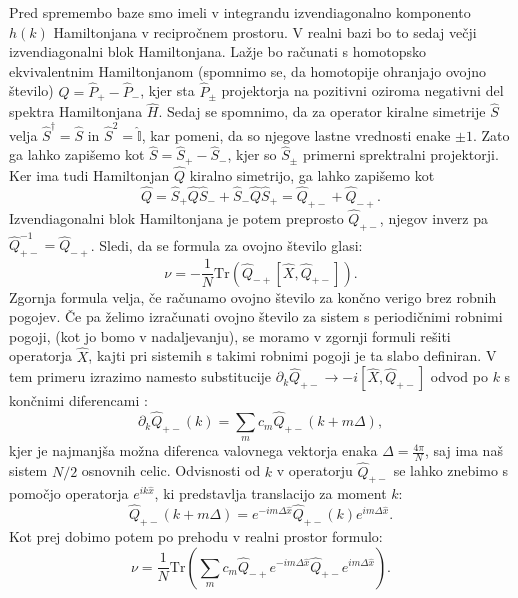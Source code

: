 Pred spremembo baze smo imeli v integrandu izvendiagonalno komponento $h(k)$ Hamiltonjana v recipročnem prostoru. V realni bazi bo to sedaj večji izvendiagonalni blok Hamiltonjana. Lažje bo računati s homotopsko ekvivalentnim Hamiltonjanom (spomnimo se, da homotopije ohranjajo ovojno število) $\hat{Q} = \hat{P}_+ -  \hat{P}_-$, kjer sta $\hat{P}_\pm$ projektorja na pozitivni oziroma negativni del spektra Hamiltonjana $\hat{H}$. Sedaj se spomnimo, da za operator kiralne simetrije $\hat{S}$ velja $\hat{S}^\dagger = \hat{S} $ in $\hat{S}^2 = \hat{\mathbb{I}}$, kar pomeni, da so njegove lastne vrednosti enake $\pm 1$. Zato ga lahko zapišemo kot $\hat{S} = \hat{S}_+ - \hat{S}_-$, kjer so $\hat{S}_\pm$ primerni sprektralni projektorji. Ker ima tudi Hamiltonjan $\hat{Q}$ kiralno simetrijo, ga lahko zapišemo kot
\begin{equation}
\hat{Q} = \hat{S}_+ \hat{Q} \hat{S}_- + \hat{S}_- \hat{Q} \hat{S}_+ = \hat{Q}_{+-} + \hat{Q}_{-+}.
\end{equation} 
Izvendiagonalni blok Hamiltonjana je potem preprosto $\hat{Q}_{+-}$, njegov inverz pa $\hat{Q}_{+-}^{-1} = \hat{Q}_{-+}$.
Sledi, da se formula za ovojno število glasi:
\begin{equation}
\nu = -\frac{1}{N} \mathrm{Tr} \left( \hat{Q}_{-+} [\hat{X},\hat{Q}_{+-}] \right).
\end{equation}
Zgornja formula velja, če računamo ovojno število za končno verigo brez robnih pogojev. Če pa želimo izračunati ovojno število za sistem s periodičnimi robnimi pogoji, (kot jo bomo v nadaljevanju), se moramo v zgornji formuli rešiti operatorja $\hat{X}$, kajti  pri sistemih s takimi robnimi pogoji je ta slabo definiran.
V tem primeru izrazimo namesto substitucije $\partial_k \hat{Q}_{+-} \to -i [\hat{X}, \hat{Q}_{+-}]$ odvod po $k$ s končnimi diferencami \cite{diference}:
\begin{equation}
\partial_k \hat{Q}_{+-}(k) = \sum_m c_m \hat{Q}_{+-} (k+m \Delta ), 
\end{equation}
kjer je najmanjša možna diferenca valovnega vektorja enaka $\Delta  = \frac{4 \pi}{N}$, saj ima naš sistem $N/2$ osnovnih celic.
Odvisnosti od $k$ v operatorju $\hat{Q}_{+-}$ se lahko znebimo s pomočjo operatorja $e^{i k \hat{x}}$, ki predstavlja translacijo za moment $k$: 
\begin{equation}
\hat{Q}_{+-}(k+m \Delta ) =e ^{-i m \Delta  \hat{x}} \hat{Q}_{+-}(k) e^{i m \Delta  \hat{x}}.
\end{equation}
Kot prej dobimo potem po prehodu v realni prostor formulo:
\begin{equation}
\nu = \frac{1}{N} \mathrm{Tr} (\sum_m c_m \hat{Q}_{-+} e^{-im \Delta \hat{x}} \hat{Q}_{+-} e^{im \Delta \hat{x}}).
\end{equation}
